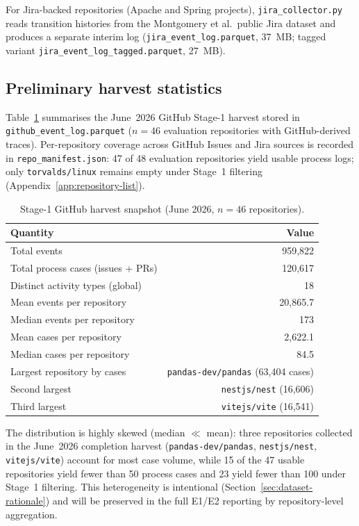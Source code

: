 For Jira-backed repositories (Apache and Spring projects), \texttt{jira\_collector.py}
reads transition histories from the Montgomery et al.\ public Jira dataset and
produces a separate interim log (\texttt{jira\_event\_log.parquet}, 37~MB;
tagged variant \texttt{jira\_event\_log\_tagged.parquet}, 27~MB).

\subsection{Preliminary harvest statistics}
\label{sec:impl-stage1-stats}

Table~\ref{tab:impl-harvest} summarises the June~2026 GitHub Stage-1 harvest stored in
\texttt{github\_event\_log.parquet} ($n = 46$ evaluation repositories with
GitHub-derived traces). Per-repository coverage across GitHub Issues and Jira
sources is recorded in \texttt{repo\_manifest.json}: 47 of 48 evaluation
repositories yield usable process logs; only \texttt{torvalds/linux} remains
empty under Stage~1 filtering (Appendix~\ref{app:repository-list}).

\begin{table}[htbp]
\centering
\caption{Stage-1 GitHub harvest snapshot (June 2026, $n = 46$ repositories).}
\label{tab:impl-harvest}
\begin{tabular}{lr}
\toprule
\textbf{Quantity} & \textbf{Value} \\
\midrule
Total events                         & 959{,}822 \\
Total process cases (issues + PRs)   & 120{,}617 \\
Distinct activity types (global)     & 18 \\
Mean events per repository         & 20{,}865.7 \\
Median events per repository       & 173 \\
Mean cases per repository          & 2{,}622.1 \\
Median cases per repository        & 84.5 \\
\midrule
Largest repository by cases          & \texttt{pandas-dev/pandas} (63{,}404 cases) \\
Second largest                       & \texttt{nestjs/nest} (16{,}606) \\
Third largest                        & \texttt{vitejs/vite} (16{,}541) \\
\bottomrule
\end{tabular}
\end{table}

The distribution is highly skewed (median $\ll$ mean): three repositories
collected in the June~2026 completion harvest
(\texttt{pandas-dev/pandas}, \texttt{nestjs/nest}, \texttt{vitejs/vite})
account for most case volume, while 15 of the 47 usable repositories
yield fewer than 50 process cases and 23 yield fewer than 100 under
Stage~1 filtering. This
heterogeneity is intentional (Section~\ref{sec:dataset-rationale}) and will be
preserved in the full E1/E2 reporting by repository-level aggregation.


